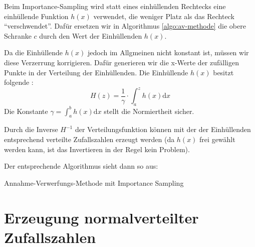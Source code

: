 Beim Importance-Sampling wird statt eines einhüllenden Rechtecks eine einhüllende
Funktion $h(x)$ verwendet, die weniger Platz als das Rechteck "`verschwendet"'.
Dafür ersetzen wir in Algorithmus \ref{algo:av-methode} die obere Schranke $c$
durch den Wert der Einhüllenden $h(x)$.

Da die Einhüllende $h(x)$ jedoch im Allgmeinen nicht konstant ist, müssen wir
diese Verzerrung korrigieren. Dafür generieren wir die x-Werte der zufälligen
Punkte in der Verteilung der Einhüllenden. Die Einhüllende $h(x)$ besitzt
folgende :
\[H(z) = \frac{1}{\gamma}\cdot\int_a^z h(x) \mathrm{d}x\]
Die Konstante $\gamma = \int_a^b h(x)\mathrm{d}x$ stellt die Normiertheit sicher.

Durch die Inverse $H^{-1}$ der Verteilungsfunktion können mit der
 der Einhüllenden entsprechend
verteilte Zufallszahlen erzeugt werden (da $h(x)$ frei gewählt werden kann, ist
das Invertieren in der Regel kein Problem).

Der entsprechende Algorithmus sieht dann so aus:

\begin{algorithm}[h!]
\DontPrintSemicolon
\LinesNumbered


\caption{Annahme-Verwerfungs-Methode mit Importance Sampling}\label{algo:av-methode-is}
\end{algorithm}

\section{Erzeugung normalverteilter Zufallszahlen}

